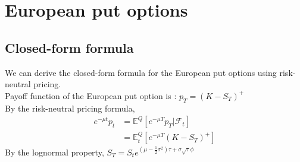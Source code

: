 \newpage

\section{European put options}

\subsection{Closed-form formula}
We can derive the closed-form formula for the European put options using risk-neutral pricing.\\
Payoff function of the European put option is : $p_{T} = (K - S_{T})^{+}$\\
By the risk-neutral pricing formula,
\begin{equation}
\begin{split}
e^{-\mu t}p_{t}
&= \mathbb{E}^{Q}[e^{-\mu T}p_{T} | \mathcal{F}_{t}]\\
&= \mathbb{E}_{t}^{Q}[e^{-\mu T}(K - S_{T})^{+}]
\end{split}
\end{equation}
By the lognormal property, \quad
$S_{T} = S_{t}e^{(\mu - \frac{1}{2}\sigma^{2})\tau + \sigma\sqrt{\tau}\phi}$
